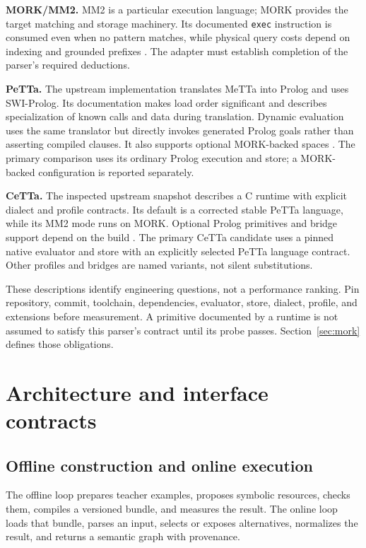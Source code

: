 \documentclass[11pt,a4paper]{article}
\newcommand{\code}[1]{\texttt{#1}}
\begin{document}
\textbf{MORK/MM2.} MM2 is a particular execution language; MORK provides
the target matching and storage machinery. Its documented \code{exec}
instruction is consumed even when no pattern matches, while physical query
costs depend on indexing and grounded prefixes \cite{morkmm2,morkdata}.
The adapter must establish completion of the parser's required deductions.

\textbf{PeTTa.} The upstream implementation translates MeTTa into Prolog
and uses SWI-Prolog. Its documentation makes load order significant and
describes specialization of known calls and data during translation.
Dynamic evaluation uses the same translator but directly invokes generated
Prolog goals rather than asserting compiled clauses. It also supports optional
MORK-backed spaces \cite{petta,pettacompiler}. The primary comparison uses
its ordinary Prolog execution and store; a MORK-backed configuration is
reported separately.

\textbf{CeTTa.} The inspected upstream snapshot describes a C runtime
with explicit dialect and profile contracts. Its default is a corrected
stable PeTTa language, while its MM2 mode runs on MORK. Optional Prolog
primitives and bridge support depend on the build \cite{cetta}.
The primary CeTTa candidate uses a pinned native evaluator and store with
an explicitly selected PeTTa language contract. Other profiles and bridges
are named variants, not silent substitutions.

These descriptions identify engineering questions, not a performance ranking.
Pin repository, commit, toolchain, dependencies, evaluator, store, dialect,
profile, and extensions before measurement. A primitive documented by a
runtime is not assumed to satisfy this parser's contract until its probe
passes. Section~\ref{sec:mork} defines those obligations.

\section{Architecture and interface contracts}\label{sec:architecture}

\subsection{Offline construction and online execution}
The offline loop prepares teacher examples, proposes symbolic resources,
checks them, compiles a versioned bundle, and measures the result. The online
loop loads that bundle, parses an input, selects or exposes alternatives,
normalizes the result, and returns a semantic graph with provenance.
\end{document}
